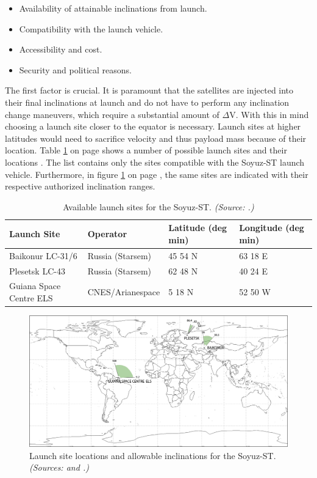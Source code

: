 \begin{itemize}
	\item Availability of attainable inclinations from launch.
	\item Compatibility with the launch vehicle.
	\item Accessibility and cost.
	\item Security and political reasons. 
\end{itemize}

The first factor is crucial. It is paramount that the satellites are injected into their final inclinations at launch and do not have to perform any inclination change maneuvers, which require a substantial amount of $\Delta$V. With this in mind choosing a launch site closer to the equator is necessary. Launch sites at higher latitudes would need to sacrifice velocity and thus payload mass because of their location. Table \ref{table:launchtable} on page \pageref{table:launchtable} shows a number of possible launch sites and their locations \cite{larson}. The list contains only the sites compatible with the Soyuz-ST launch vehicle. Furthermore, in figure \ref{fig:launchsites} on page \pageref{fig:launchsites}, the same sites are indicated with their respective authorized inclination ranges.

\begin{table}[ht!]
\begin{centering}
\begin{tabular}{llp{2cm}p{2cm}}
\toprule
Launch Site & Operator & Latitude (deg min) & Longitude (deg min) \\
\hline \hline
Baikonur LC-31/6  & Russia (Starsem) & 45 54 N & 63 18 E \\
Plesetsk LC-43  & Russia (Starsem)   &  62 48 N & 40 24 E \\
Guiana Space Centre  ELS  & CNES/Arianespace  & 5 18 N & 52 50 W \\
\bottomrule
\end{tabular}
\caption{Available launch sites for the Soyuz-ST. \emph{(Source: \cite{larson}.)}}
\label{table:launchtable}
\end{centering}
\end{table}  

\begin{figure}[ht!]
\centering
\includegraphics[width=1.0\textwidth, angle=0]{chapters/img/launchsites.png}
\caption{Launch site locations and allowable inclinations for the Soyuz-ST. \emph{(Sources: \cite{constDesign} and \cite{rockotman}.)} }
\label{fig:launchsites}
\end{figure}


